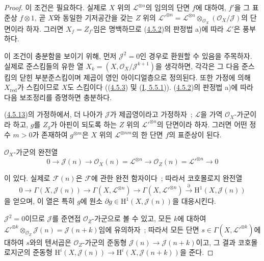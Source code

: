 \begin{proof}
이 조건은 필요하다. 실제로 $X$ 위의 $\mathcal{L}^{\otimes n}$의 임의의
단면 $f$에 대하여, $f'$을 그 표준상 $f\otimes1$, 곧 $X$와 동일한
기저공간을 갖는 $Z$ 위의
$\mathcal{L}'^{\otimes n}=\mathcal{L}^{\otimes n}
\otimes_{\mathcal{O}_X}(\mathcal{O}_X/\mathcal{J})$의 단면이라 하자.
그러면 $X_f=Z_{f'}$임은 명백하므로
(\hyperref[II.4.5.2-ko]{4.5.2})의 판정법 a)에 따라
$\mathcal{L}'$은 풍부하다.

이 조건이 충분함을 보이기 위해, 먼저 $\mathcal{J}^2=0$인 경우로
환원할 수 있음을 주목하자. 실제로 준스킴들의 유한 열
$X_k=(X,\mathcal{O}_X/\mathcal{J}^{k+1})$을 생각하면, 각각은 그 다음
준스킴의 닫힌 부분준스킴이며 제곱이 영인 아이디얼층으로 정의된다.
또한 가정에 의해 $X_{\mathrm{red}}$가 스킴이므로 $X$도 스킴이다
((\hyperref[II.4.5.3-ko]{4.5.3}) 및
(\hyperref[I.5.5.1-ko]{I, 5.5.1})).
(\hyperref[II.4.5.2-ko]{4.5.2})의 판정법 a)에 따라 다음 보조정리를
증명하면 충분하다.

\begin{lemma}[4.5.13.1]
\label{II.4.5.13.1-ko}
(\hyperref[II.4.5.13-ko]{4.5.13})의 가정하에서, 더 나아가
$\mathcal{J}$가 제곱영이라고 가정하자~; $\mathcal{L}$을 가역
$\mathcal{O}_X$-가군이라 하고, $g$를 $Z_g$가 아핀이 되도록 하는
$Z$ 위의 $\mathcal{L}'^{\otimes n}$의 단면이라 하자. 그러면 어떤
정수 $m>0$가 존재하여 $g^{\otimes m}$은 $X$ 위의
$\mathcal{L}^{\otimes nm}$의 한 단면 $f$의 표준상이 된다.
\end{lemma}

$\mathcal{O}_X$-가군의 완전열
\[
  0\longrightarrow\mathcal{J}(n)\longrightarrow
  \mathcal{O}_X(n)=\mathcal{L}^{\otimes n}\longrightarrow
  \mathcal{O}_Z(n)=\mathcal{L}'^{\otimes n}\longrightarrow0
\]


이 있다. 실제로 $\mathcal{F}(n)$은 $\mathcal{F}$에 관한 완전
함자이다~; 따라서 코호몰로지 완전열
\[
  0\longrightarrow\Gamma(X,\mathcal{J}(n))\longrightarrow
  \Gamma(X,\mathcal{L}^{\otimes n})\longrightarrow
  \Gamma(X,\mathcal{L}'^{\otimes n})\xrightarrow{\partial}
  \mathrm{H}^1(X,\mathcal{J}(n))
\]
을 얻으며, 이 열은 특히 $g$에 원소
$\partial g\in\mathrm{H}^1(X,\mathcal{J}(n))$을 대응시킨다.

$\mathcal{J}^2=0$이므로 $\mathcal{J}$를 준연접
$\mathcal{O}_Z$-가군으로 볼 수 있고, 모든 $k$에 대하여
$\mathcal{L}'^{\otimes k}\otimes_{\mathcal{O}_Z}\mathcal{J}(n)
=\mathcal{J}(n+k)$임에 유의하자~; 따라서 모든 단면
$s\in\Gamma(X,\mathcal{L}'^{\otimes k})$에 대하여 $s$와의 텐서곱은
$\mathcal{O}_Z$-가군의 준동형
$\mathcal{J}(n)\to\mathcal{J}(n+k)$이고, 그 결과 코호몰로지군의
준동형
$\mathrm{H}^i(X,\mathcal{J}(n))\to
\mathrm{H}^i(X,\mathcal{J}(n+k))$을 준다.


\end{proof}
